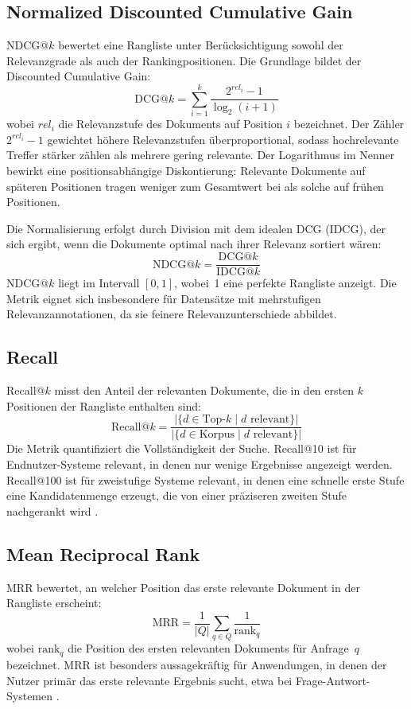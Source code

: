 \subsection{Normalized Discounted Cumulative Gain}
%
NDCG@$k$ \cite{jarvelin_2002_ndcg} bewertet eine Rangliste unter Berücksichtigung sowohl der Relevanzgrade als auch der Rankingpositionen.
Die Grundlage bildet der Discounted Cumulative Gain:
\begin{equation}
  \text{DCG@}k = \sum_{i=1}^{k} \frac{2^{rel_i} - 1}{\log_2(i + 1)}
\end{equation}
%
wobei $rel_i$ die Relevanzstufe des Dokuments auf Position $i$ bezeichnet.
Der Zähler $2^{rel_i} - 1$ gewichtet höhere Relevanzstufen überproportional, sodass hochrelevante Treffer stärker zählen als mehrere gering relevante.
Der Logarithmus im Nenner bewirkt eine positionsabhängige Diskontierung: Relevante Dokumente auf späteren Positionen tragen weniger zum Gesamtwert bei als solche auf frühen Positionen.
\par
Die Normalisierung erfolgt durch Division mit dem idealen DCG (IDCG), der sich ergibt, wenn die Dokumente optimal nach ihrer Relevanz sortiert wären:
\begin{equation}
  \text{NDCG@}k = \frac{\text{DCG@}k}{\text{IDCG@}k}
\end{equation}
%
NDCG@$k$ liegt im Intervall $[0, 1]$, wobei~1 eine perfekte Rangliste anzeigt.
Die Metrik eignet sich insbesondere für Datensätze mit mehrstufigen Relevanzannotationen, da sie feinere Relevanzunterschiede abbildet.
%
\subsection{Recall}
%
Recall@$k$ \cite{manning_2008_ir} misst den Anteil der relevanten Dokumente, die in den ersten $k$ Positionen der Rangliste enthalten sind:
\begin{equation}
  \text{Recall@}k = \frac{|\{d \in \text{Top-}k \mid d \text{ relevant}\}|}{|\{d \in \text{Korpus} \mid d \text{ relevant}\}|}
\end{equation}
%
Die Metrik quantifiziert die Vollständigkeit der Suche.
Recall@10 ist für Endnutzer-Systeme relevant, in denen nur wenige Ergebnisse angezeigt werden.
Recall@100 ist für zweistufige Systeme relevant, in denen eine schnelle erste Stufe eine Kandidatenmenge erzeugt, die von einer präziseren zweiten Stufe nachgerankt wird \cite{nogueira_2019_rerank}.
%
\subsection{Mean Reciprocal Rank}
%
MRR \cite{craswell_2009_mrr} bewertet, an welcher Position das erste relevante Dokument in der Rangliste erscheint:
\begin{equation}
  \text{MRR} = \frac{1}{|Q|} \sum_{q \in Q} \frac{1}{\text{rank}_q}
\end{equation}
%
wobei $\text{rank}_q$ die Position des ersten relevanten Dokuments für Anfrage~$q$ bezeichnet.
MRR ist besonders aussagekräftig für Anwendungen, in denen der Nutzer primär das erste relevante Ergebnis sucht, etwa bei Frage-Antwort-Systemen \cite{craswell_2009_mrr,voorhees_1999_trec8qa}.
%
